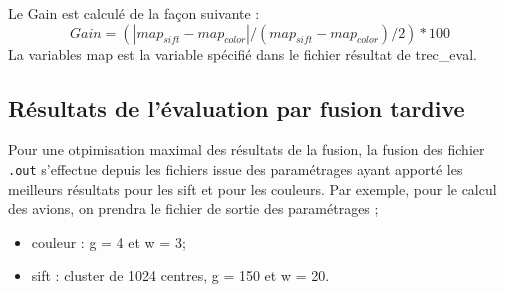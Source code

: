 \documentclass[a4paper, 11pt]{article}
\begin{document}
\begin{center}
\end{center}
Le Gain est calculé de la façon suivante :
\begin{equation}
  Gain = (| map_{sift} - map_{color} | / (map_{sift} - map_{color}) / 2) * 100
\end{equation}
La variables map est la variable spécifié dans le fichier résultat de trec\_eval.

\subsection{Résultats de l'évaluation par fusion tardive}

Pour une otpimisation maximal des résultats de la fusion, la fusion des fichier \texttt{.out} s'effectue depuis les fichiers issue des paramétrages ayant apporté les meilleurs résultats pour les sift et pour les couleurs.
Par exemple, pour le calcul des avions, on prendra le fichier de sortie des paramétrages ;
\begin{itemize}
	\item couleur : g = 4 et w = 3;
	\item sift : cluster de 1024 centres, g = 150 et w = 20.
\end{itemize}

\begin{center}
\end{center}
\end{document}
